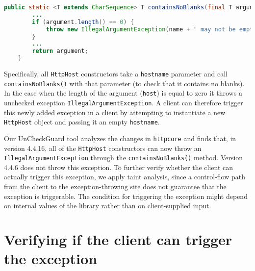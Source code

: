 \begin{lstlisting}[language=Java]
  public static <T extends CharSequence> T containsNoBlanks(final T argument, final String name) {
        ...
        if (argument.length() == 0) {
            throw new IllegalArgumentException(name + " may not be empty");
        }
        ...
        return argument;
    }
\end{lstlisting}

Specifically, all \texttt{HttpHost} constructors take a \texttt{hostname} parameter and call \texttt{containsNoBlanks()}
with that parameter (to check that it contains no blanks). In the case when the length of the argument (\texttt{host}) is equal to zero it throws a unchecked exception \texttt{IllegalArgumentException}. A client can therefore trigger this newly added exception
in a client by attempting to instantiate a new \texttt{HttpHost} object and passing it an empty
\texttt{hostname}.

Our UnCheckGuard tool analyzes the changes in \texttt{httpcore} and finds that, in version 4.4.16, all of the \texttt{HttpHost} constructors can now throw an \texttt{IllegalArgumentException} through the \texttt{containsNoBlanks()} method. Version 4.4.6 does not throw this exception. To further verify whether the client can actually trigger this exception, we apply taint analysis, since a control-flow path from the client to the exception-throwing site does not guarantee that the exception is triggerable. The condition for triggering the exception might depend on internal values of the library rather than on client-supplied input.

\section{Verifying if the client can trigger the exception}



